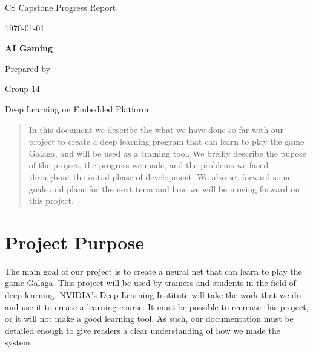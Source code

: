 \documentclass[onecolumn, draftclsnofoot,10pt, compsoc]{IEEEtran}
\def \CapstoneTeamName{		Deep Learning on Embedded Platform}
\def \CapstoneTeamNumber{		14}
\def \CapstoneProjectName{		AI Gaming}
\def \DocType{	%
				Progress Report
				}
\begin{document}
\begin{titlepage}
    \begin{singlespace}
        \hfill
        \par\vspace{.2in}
        \centering
        \scshape{
            \huge CS Capstone \DocType \par
            {\large\today}\par
            \vspace{.5in}
            \textbf{\Huge\CapstoneProjectName}\par
            {\large Prepared by }\par
            Group\CapstoneTeamNumber\par
            \CapstoneTeamName\par
            \vspace{5pt}
        }
        \begin{abstract}
        In this document we describe the what we have done so far with our project to create a deep learning program that can learn to play the game Galaga, and will be used as a training tool.
	We breifly describe the pupose of the project, the progress we made, and the problems we faced throughout the initial phase of development.
	We also set forward some goals and plans for the next term and how we will be moving forward on this project.	

        \end{abstract}
    \end{singlespace}
\end{titlepage}

\newpage
{}
\tableofcontents

\section{Project Purpose}
The main goal of our project is to create a neural net that can learn to play the game Galaga.
This project will be used by trainers and students in the field of deep learning.
NVIDIA's Deep Learning Institute will take the work that we do and use it to create a learning course.
It must be possible to recreate this project, or it will not make a good learning tool.
As such, our documentation must be detailed enough to give readers a clear understanding of how we made the system.
\end{document}

